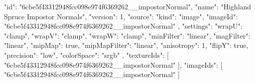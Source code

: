 {
  "id": "6cbe5f43312948fcc098e974f6369262__impostorNormal",
  "name": "Highland Spruce Impostor Normals",
  "version": 1,
  "source": {
    "kind": "image",
    "imageId": "6cbe5f43312948fcc098e974f6369262__impostorNormal"
  },
  "settings": {
    "wrapU": "clamp",
    "wrapV": "clamp",
    "wrapW": "clamp",
    "minFilter": "linear",
    "magFilter": "linear",
    "mipMap": true,
    "mipMapFilter": "linear",
    "anisotropy": 1,
    "flipY": true,
    "precision": "low",
    "colorSpace": "srgb"
  },
  "textureIds": [
    "6cbe5f43312948fcc098e974f6369262__impostorNormal"
  ],
  "imageIds": [
    "6cbe5f43312948fcc098e974f6369262__impostorNormal"
  ]
}
